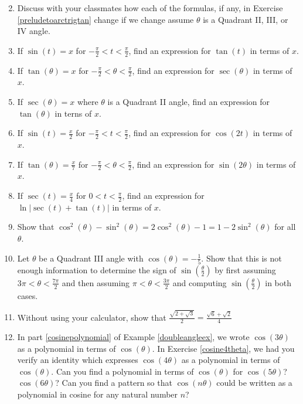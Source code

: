 \begin{enumerate}
\begin{multicols}{2}
\begin{enumerate}
\end{enumerate}

\end{multicols}

\item  Discuss with your classmates how each of the formulas, if any, in Exercise \ref{preludetoarctrigtan} change if we change assume $\theta$ is a Quadrant II, III, or IV angle.

\item  If $\sin(t) = x$ for  $-\frac{\pi}{2} < t < \frac{\pi}{2}$, find an expression for $\tan(t)$ in terms of $x$.

\item  If $\tan(\theta) = x$ for $-\frac{\pi}{2} < \theta < \frac{\pi}{2}$,  find an expression for $\sec(\theta)$ in terms of $x$.

\item  If $\sec(\theta) = x$ where  $\theta$ is a Quadrant II angle, find  an expression for $\tan(\theta)$ in terns of $x$.

\item If $\sin(t) = \frac{x}{2}$ for $-\frac{\pi}{2} < t < \frac{\pi}{2}$, find an expression for $\cos(2t)$ in terms of $x$.

\item If $\tan(\theta) = \frac{x}{7}$ for $-\frac{\pi}{2} < \theta < \frac{\pi}{2}$, find an expression for $\sin(2\theta)$ in terms of $x$.

\item If $\sec(t) = \frac{x}{4}$ for $0 < t < \frac{\pi}{2}$, find an expression for $\ln|\sec(t) + \tan(t)|$ in terms of $x$.

\item Show that $\cos^{2}(\theta) - \sin^{2}(\theta) = 2\cos^{2}(\theta) - 1 = 1 - 2\sin^{2}(\theta)$ for all $\theta$.

\item Let $\theta$ be a Quadrant III angle with $\cos(\theta) = -\frac{1}{5}$.  Show that this is not enough information to determine the sign of  $\sin\left(\frac{\theta}{2}\right)$ by first assuming $3\pi < \theta < \frac{7\pi}{2}$ and then assuming $\pi < \theta < \frac{3\pi}{2}$ and computing $\sin\left(\frac{\theta}{2}\right)$ in both cases.

\item Without using your calculator, show that $\frac{\sqrt{2 + \sqrt{3}}}{2} = \frac{\sqrt{6} + \sqrt{2}}{4}$

\item In part \ref{cosinepolynomial} of Example \ref{doubleangleex}, we wrote $\cos(3\theta)$ as a polynomial in terms of $\cos(\theta)$.  In Exercise \ref{cosine4theta}, we had you verify an identity which expresses $\cos(4\theta)$ as a polynomial in terms of $\cos(\theta)$.   Can you find a polynomial in terms of $\cos(\theta)$ for $\cos(5\theta)$?  $\cos(6\theta)$?  Can you find a pattern so that $\cos(n\theta)$ could be written as a polynomial in cosine for any natural number $n$?


\end{enumerate}

